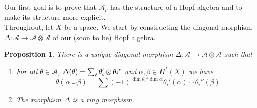 \documentclass[11pt, a4paper]{article}
\newtheorem{propo}[thm]{Proposition}
\theoremstyle{plain}
\begin{document}
Our first goal is to prove that $\mathcal{A}_p$ has the structure of a Hopf algebra and to make its structure more explicit.\\
Throughout, let $X$ be a space.
We start by constructing the diagonal morphism $\Delta\colon \mathcal{A} \to \mathcal{A} \otimes \mathcal{A}$ of our (soon to be) Hopf algebra.
\begin{propo}
	There is a unique diagonal morphism $\Delta\colon \mathcal{A}\to  \mathcal{A} \otimes \mathcal{A}$ such that
	\begin{enumerate}
		\item For all $\theta \in  \mathcal{A}$, $\Delta( \theta) = \sum_i \theta_i' \otimes \theta_i"$ and $\alpha,\beta \in H^{\ast}( X) $  we have
			\[ 
			\theta( \alpha\smile \beta) = \sum ( -1) ^{\dim \theta_i''\dim \alpha}\theta_i'( \alpha) \smile \theta_i''( \beta) 
			\]
			
	\item The morphism $\Delta$ is a ring morphism.
	\end{enumerate}
\end{propo}
\end{document}
